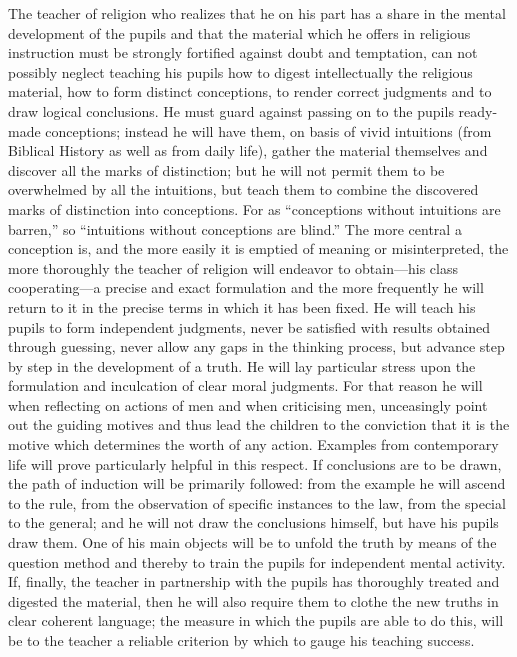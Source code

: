 The teacher of religion who realizes that he on his part has a share in the mental development of the pupils and that the material which he offers in religious instruction must be strongly fortified against doubt and temptation, can not possibly neglect teaching his pupils how to digest intellectually the religious material, how to form distinct conceptions, to render correct judgments and to draw logical conclusions. He must guard against passing on to the pupils ready-made conceptions; instead he will have them, on basis of vivid intuitions (from Biblical History as well as from daily life), gather the material themselves and discover all the marks of distinction; but he will not permit them to be overwhelmed by all the intuitions, but teach them to combine the discovered marks of distinction into conceptions. For as “conceptions without intuitions are barren,” so “intuitions
without conceptions are blind.” The more central a conception is, and the more easily it is emptied of meaning or misinterpreted, the more thoroughly the teacher of religion will endeavor to obtain—his class cooperating—a precise and exact formulation and the more frequently he will return to it in the precise terms in which it has been fixed. He will teach his pupils to form independent judgments, never be satisfied with results obtained through guessing, never allow any gaps in the thinking process, but advance step by step in the development of a truth. He will lay particular stress upon the formulation and inculcation of clear moral judgments. For that reason he will when reflecting on actions of men and when criticising men, unceasingly point out the guiding motives and thus lead the children to the conviction that it is the motive which determines the worth of any action. Examples from contemporary life will prove particularly helpful in this respect. If conclusions are to be drawn, the path of induction will be primarily followed: from the example he will ascend to the rule, from the observation of specific instances to the law, from the special to the general; and he will not draw the conclusions himself, but have his pupils draw them. One of his main objects will be to unfold the truth by means of the question method and thereby to train the pupils for independent mental activity. If, finally, the teacher in partnership with the pupils has thoroughly treated and digested the material, then he will also require them to clothe the new truths in clear coherent language; the measure in which the pupils are able to do this, will be to the teacher a reliable criterion by which to gauge his teaching success.

